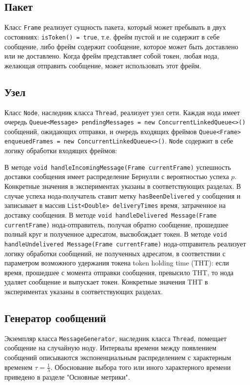 \documentclass{article}
\begin{document}
\subsection{Пакет}
Класс \lstinline|Frame| реализует сущность пакета, который может пребывать в двух состояниях: \lstinline|isToken() = true|, т.е. фрейм пустой и не содержит в себе сообщение, либо фрейм содержит сообщение, которое может быть доставлено или не доставлено. Когда фрейм представляет собой токен, любая нода, желающая отправить сообщение, может использовать этот фрейм.

\subsection{Узел}
Класс \lstinline|Node|, наследник класса \lstinline|Thread|, реализует узел сети. Каждая нода имеет очередь \lstinline|Queue<Message> pendingMessages = new ConcurrentLinkedQueue<>()| сообщений, ожидающих отправки, и очередь входящих фреймов \lstinline|Queue<Frame> enqueuedFrames = new ConcurrentLinkedQueue<>()|. \lstinline|Node| содержит в себе логику обработки входящих фреймов:



В методе \lstinline|void handleIncomingMessage(Frame currentFrame)| успешность доставки сообщения имеет распределение Бернулли с вероятностью успеха $p$. Конкретные значения в экспериментах указаны в соответствующих разделах. В случае успеха нода-получатель ставит метку \lstinline|hasBeenDelivered| у сообщения и записывает в массив \lstinline|List<Double> deliveryTimes| время, затраченное на доставку сообщения. В методе \lstinline|void handleDelivered Message(Frame currentFrame)| нода-отправитель, получая обратно сообщение, прошедшее полный круг и полученное адресатом, высвобождает токен. В методе \lstinline|void handleUndelivered Message(Frame currentFrame)| нода-отправитель реализует логику обработки сообщений, не полученных адресатом, в соответствии с параметром возможного удержания токена token holding time (THT): если время, прошедшее с момента отправки сообщения, превысило THT, то нода удаляет сообщение и выпускает токен. Конкретные значения THT в экспериментах указаны в соответствующих разделах.

\subsection{Генератор сообщений}
Экземпляр класса \lstinline|MessageGenerator|, наследник класса \lstinline|Thread|, помещает сообщение на случайную ноду. Интервалы времени между появлением сообщений описываются экспоненциальным распределением с характерным временем $\tau=\frac{1}{\lambda}$. Обоснование выбора того или иного характерного времени приведено в разделе "Основные метрики".
\end{document}
